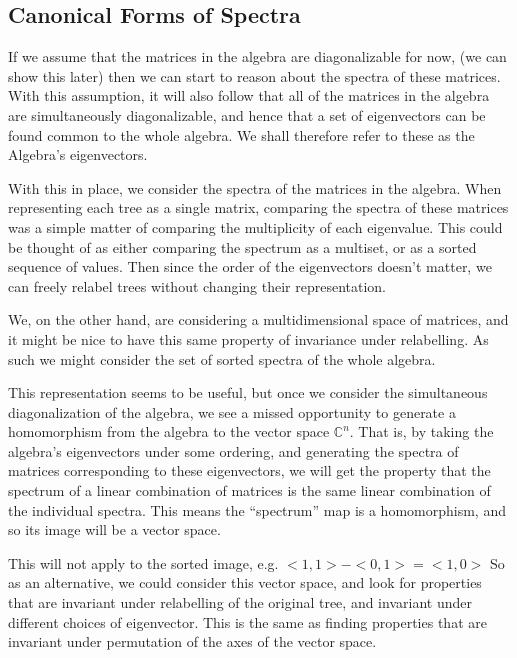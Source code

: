 \documentclass{report}
\begin{document}
\subsection{Canonical Forms of Spectra}

If we assume that the matrices in the algebra are diagonalizable for now, (we
can show this later) then we can start to reason about the spectra of these
matrices.
With this assumption, it will also follow that all of the matrices in the
algebra are simultaneously diagonalizable, and hence that a set of eigenvectors
can be found common to the whole algebra.
We shall therefore refer to these as the Algebra's eigenvectors.

With this in place, we consider the spectra of the matrices in the algebra.
When representing each tree as a single matrix, comparing the spectra of these
matrices was a simple matter of comparing the multiplicity of each eigenvalue.
This could be thought of as either comparing the spectrum as a multiset, or as
a sorted sequence of values.
Then since the order of the eigenvectors doesn't matter, we can freely relabel
trees without changing their representation.

We, on the other hand, are considering a multidimensional space of matrices,
and it might be nice to have this same property of invariance under
relabelling.
As such we might consider the set of sorted spectra of the whole algebra.

This representation seems to be useful, but once we consider the simultaneous
diagonalization of the algebra, we see a missed opportunity to generate a
homomorphism from the algebra to the vector space $\mathds{C}^n$.
That is, by taking the algebra's eigenvectors under some ordering, and
generating the spectra of matrices corresponding to these eigenvectors, we will
get the property that the spectrum of a linear combination of matrices is the
same linear combination of the individual spectra.
This means the ``spectrum'' map is a homomorphism, and so its image will be a
vector space.

This will not apply to the sorted image, e.g. $<1, 1> - <0, 1> = <1, 0>$
So as an alternative, we could consider this vector space, and look for
properties that are invariant under relabelling of the original tree, and
invariant under different choices of eigenvector.
This is the same as finding properties that are invariant under permutation of
the axes of the vector space.
\end{document}
